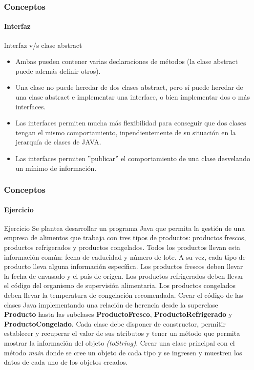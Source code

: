 \documentclass{beamer}
\begin{document}
		\begin{frame}
			\frametitle{Conceptos}
			\framesubtitle{Interfaz}

			\begin{block}{Interfaz v/s clase abstract}
				\begin{itemize}
  					\item Ambas pueden contener varias declaraciones de m\'etodos (la clase abstract puede adem\'as definir otros). 
					\item Una clase no puede heredar de dos clases abstract, pero s\'i puede heredar de una clase abstract e implementar una interface, o bien implementar dos o m\'as interfaces.
					\item Las interfaces permiten mucha m\'as flexibilidad para conseguir que dos clases tengan el mismo comportamiento, inpendientemente de su situaci\'on en la jerarqu\'ia de clases de JAVA.
					\item Las interfaces permiten ''publicar'' el comportamiento de una clase desvelando un m\'inimo de informaci\'on.
				\end{itemize}
			\end{block}
		\end{frame}    
    
		\begin{frame}
			\frametitle{Conceptos}
			\framesubtitle{Ejercicio}

			\begin{exampleblock}{Ejercicio}
			{\scriptsize
				Se plantea desarrollar un programa Java que permita la gesti\'on de una empresa de alimentos que trabaja con tres tipos de productos: productos frescos, productos refrigerados y productos congelados. Todos los productos llevan esta informaci\'on com\'un: fecha de caducidad y n\'umero de lote. A su vez, cada tipo de producto lleva alguna informaci\'on espec\'ifica. Los productos frescos deben llevar la fecha de envasado y el pa\'is de origen. Los productos refrigerados deben llevar el c\'odigo del organismo de supervisi\'on alimentaria. Los productos congelados deben llevar la temperatura de congelaci\'on recomendada. Crear el c\'odigo de las clases Java implementando una relaci\'on de herencia desde la superclase \textbf{Producto} hasta las subclases \textbf{ProductoFresco}, \textbf{ProductoRefrigerado} y \textbf{ProductoCongelado}. Cada clase debe disponer de constructor, permitir establecer y recuperar el valor de sus atributos y tener un m\'etodo que permita mostrar la informaci\'on del objeto \emph{(toString)}. Crear una clase principal con el m\'etodo \emph{main} donde se cree un objeto de cada tipo y se ingresen y muestren los datos de cada uno de los objetos creados.}
			\end{exampleblock}
		\end{frame}       
\end{document}
